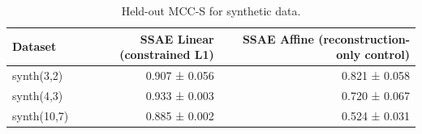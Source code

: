 \begin{table}[t]
\centering
\caption{Held-out MCC-S for synthetic data.}
\label{tab:synthetic-mcc-s}
\begin{tabular}{lrr}
\toprule
Dataset & SSAE Linear (constrained L1) & SSAE Affine (reconstruction-only control) \\
\midrule
synth(3,2) & 0.907 ± 0.056 & 0.821 ± 0.058 \\
synth(4,3) & 0.933 ± 0.003 & 0.720 ± 0.067 \\
synth(10,7) & 0.885 ± 0.002 & 0.524 ± 0.031 \\
\bottomrule
\end{tabular}
\end{table}

